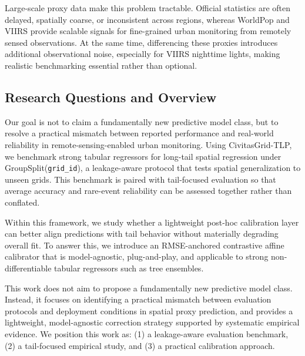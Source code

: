 \documentclass[preprint,12pt]{elsarticle}
\begin{document}
Large-scale proxy data make this problem tractable. Official statistics are often delayed, spatially coarse, or inconsistent across regions, whereas WorldPop and VIIRS provide scalable signals for fine-grained urban monitoring from remotely sensed observations. At the same time, differencing these proxies introduces additional observational noise, especially for VIIRS nighttime lights, making realistic benchmarking essential rather than optional.

\subsection{Research Questions and Overview}

Our goal is not to claim a fundamentally new predictive model class, but to resolve a practical mismatch between reported performance and real-world reliability in remote-sensing-enabled urban monitoring. Using CivitasGrid-TLP, we benchmark strong tabular regressors for long-tail spatial regression under GroupSplit(\texttt{grid\_id}), a leakage-aware protocol that tests spatial generalization to unseen grids. This benchmark is paired with tail-focused evaluation so that average accuracy and rare-event reliability can be assessed together rather than conflated.

Within this framework, we study whether a lightweight post-hoc calibration layer can better align predictions with tail behavior without materially degrading overall fit. To answer this, we introduce an RMSE-anchored contrastive affine calibrator that is model-agnostic, plug-and-play, and applicable to strong non-differentiable tabular regressors such as tree ensembles.

This work does not aim to propose a fundamentally new predictive model class. Instead, it focuses on identifying a practical mismatch between evaluation protocols and deployment conditions in spatial proxy prediction, and provides a lightweight, model-agnostic correction strategy supported by systematic empirical evidence. We position this work as: (1) a leakage-aware evaluation benchmark, (2) a tail-focused empirical study, and (3) a practical calibration approach.
\end{document}
